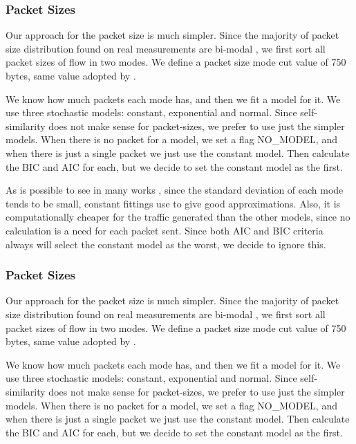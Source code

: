 \subsubsection{Packet Sizes}


Our approach for the packet size is much simpler. Since the majority of packet size distribution found on real measurements are bi-modal \cite{packet-distribution-model}\cite{sourcesonoff-paper}\cite{udp-flows-model}, we first sort all packet sizes of flow in two modes. We define a packet size mode cut value of 750 bytes, same value adopted by \cite{udp-flows-model}. 


We know how much packets each mode has, and then we fit a model for it. We use three stochastic models: constant, exponential and normal. Since self-similarity does not make sense for packet-sizes, we prefer to use just the simpler models. When there is no packet for a model, we set a flag NO\_MODEL, and when there is just a single packet we just use the constant model. Then calculate the BIC and AIC for each, but we decide to set the constant model as the first.

As is possible to see in many works \cite{packet-distribution-model} \cite{udp-flows-model}, since the standard deviation of each mode tends to be small, constant fittings use to give good approximations. Also, it is computationally cheaper for the traffic generated than the other models, since no calculation is a need for each packet sent. Since both AIC and BIC criteria always will select the constant model as the worst, we decide to ignore this.

\subsubsection{Packet Sizes}

Our approach for the packet size is much simpler. Since the majority of packet size distribution found on real measurements are bi-modal \cite{packet-distribution-model}\cite{sourcesonoff-paper}\cite{udp-flows-model}, we first sort all packet sizes of flow in two modes. We define a packet size mode cut value of 750 bytes, same value adopted by \cite{udp-flows-model}. 

We know how much packets each mode has, and then we fit a model for it. We use three stochastic models: constant, exponential and normal. Since self-similarity does not make sense for packet-sizes, we prefer to use just the simpler models. When there is no packet for a model, we set a flag NO\_MODEL, and when there is just a single packet we just use the constant model. Then calculate the BIC and AIC for each, but we decide to set the constant model as the first.


